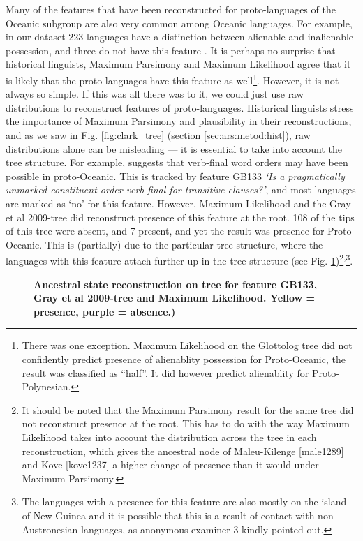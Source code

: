 \documentclass[draft,10pt]{article} %
\begin{document}
Many of the features that have been reconstructed for proto-languages of the Oceanic subgroup are also very common among Oceanic languages. For example, in our dataset 223 languages have a distinction between alienable and inalienable possession, and three do not have this feature . It is perhaps no surprise that historical linguists, Maximum Parsimony and Maximum Likelihood  agree that it is likely that the proto-languages have this feature as well\footnote{There was one exception. Maximum Likelihood on the Glottolog tree did not confidently predict presence of alienablity possession for Proto-Oceanic, the result was classified as ``half''. It did however predict alienablity for Proto-Polynesian.}. However, it is not always so simple. If this was all there was to it, we could just use raw distributions to reconstruct features of proto-languages. Historical linguists stress the importance of Maximum Parsimony and plausibility in their reconstructions, and as we saw in Fig. \ref{fig:clark_tree} (section \ref{sec:ars:metod:hist}), raw distributions alone can be misleading --- it is essential to take into account the tree structure. For example, \citet[118]{pawley1973some} suggests that verb-final word orders may have been possible in proto-Oceanic. This is tracked by feature GB133 \emph{`Is a pragmatically unmarked constituent order verb-final for transitive clauses?'}, and most languages are marked as `no' for this feature. However, Maximum Likelihood and the Gray et al 2009-tree did reconstruct presence of this feature at the root. 108 of the tips of this tree were absent, and 7 present, and yet the result was presence for Proto-Oceanic. This is (partially) due to the particular tree structure, where the languages with this feature attach further up in the tree structure (see Fig. \ref{GB133_tree_ML_gray})\footnote{It should be noted that the Maximum Parsimony result for the same tree did not reconstruct presence at the root. This has to do with the way Maximum Likelihood takes into account the distribution across the tree in each reconstruction, which gives the ancestral node of Maleu-Kilenge [male1289] and Kove [kove1237] a higher change of presence than it would under Maximum Parsimony.}\textsuperscript{,}\footnote{The languages with a presence for this feature are also mostly on the island of New Guinea and it is possible that this is a result of contact with non-Austronesian languages, as anonymous examiner 3 kindly pointed out.}.

\newpage
\begin{figure}
\centering
\caption[Ancestral state reconstruction on tree for feature GB133, Gray et al 2009-tree and Maximum Likelihood.]{\textbf{Ancestral state reconstruction on tree for feature GB133, Gray et al 2009-tree and Maximum Likelihood. Yellow = presence, purple = absence.)}}
\label{GB133_tree_ML_gray}
\end{figure}
\end{document}
